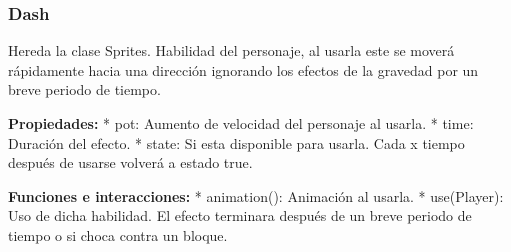 \documentclass{article}
\begin{document}
\subsubsection*{Dash}
Hereda la clase Sprites. Habilidad del personaje, al usarla este se moverá rápidamente hacia una dirección ignorando los efectos de la gravedad por un breve periodo de tiempo. \newline

\subitem \textbf{Propiedades:} \newline
* pot: Aumento de velocidad del personaje al usarla.\newline
* time: Duración del efecto.\newline
* state: Si esta disponible para usarla. Cada x tiempo después de usarse volverá a estado true.\newline

\subitem \textbf{Funciones e interacciones:} \newline
* animation(): Animación al usarla.\newline
* use(Player): Uso de dicha habilidad. El efecto terminara después de un breve periodo de tiempo o si choca contra un bloque. \newline
\end{document}
